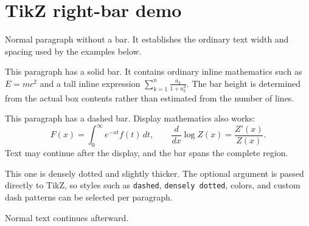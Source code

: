 \documentclass[11pt]{article}
\begin{document}
\section*{TikZ right-bar demo}

Normal paragraph without a bar. It establishes the ordinary text width and spacing used by the examples below.

\begin{rightbar}
This paragraph has a solid bar. It contains ordinary inline mathematics such as
$E=mc^2$ and a tall inline expression
$\displaystyle \sum_{k=1}^{n}\frac{a_k}{1+a_k^2}$.
The bar height is determined from the actual box contents rather than estimated from the number of lines.
\end{rightbar}

\begin{rightbar}[dashed]
This paragraph has a dashed bar. Display mathematics also works:
\[
  F(x)=\int_0^\infty e^{-xt}f(t)\,dt,
  \qquad
  \frac{d}{dx}\log Z(x)=\frac{Z'(x)}{Z(x)}.
\]
Text may continue after the display, and the bar spans the complete region.
\end{rightbar}

\begin{rightbar}[densely dotted,line width=1.2pt]
This one is densely dotted and slightly thicker. The optional argument is passed directly to TikZ, so styles such as \texttt{dashed}, \texttt{densely dotted}, colors, and custom dash patterns can be selected per paragraph.
\end{rightbar}

Normal text continues afterward.
\end{document}
